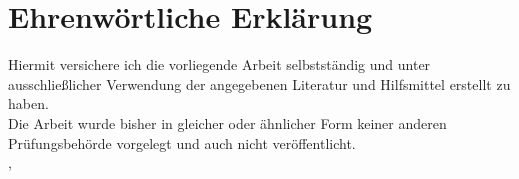 \thispagestyle{empty}

\section*{Ehrenwörtliche Erklärung}

\vspace*{2em}

Hiermit versichere ich die vorliegende Arbeit selbstständig und unter ausschließlicher Verwendung der angegebenen Literatur und Hilfsmittel erstellt zu haben.
\vspace*{2em}
\\
Die Arbeit wurde bisher in gleicher oder ähnlicher Form keiner anderen Prüfungsbehörde vorgelegt und auch nicht veröffentlicht.
\vspace{5em}
\\
\abgabeort, \datumAbgabe
\vspace{3em}
\\
\autor


